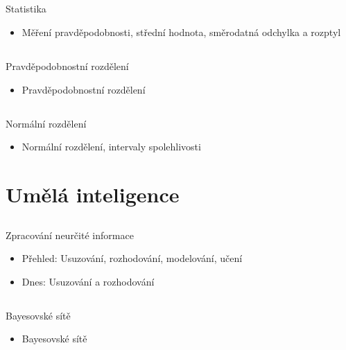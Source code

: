 \documentclass{beamer}
\begin{document}
\subsection{}
\begin{frame}{Statistika}
\begin{itemize}
\item Měření pravděpodobnosti, střední hodnota, směrodatná odchylka a rozptyl
\end{itemize}
\end{frame}

\subsection{}
\begin{frame}{Pravděpodobnostní rozdělení}
\begin{itemize}
\item Pravděpodobnostní rozdělení
\end{itemize}
\end{frame}

\subsection{}
\begin{frame}{Normální rozdělení}
\begin{itemize}
\item Normální rozdělení, intervaly spolehlivosti
\end{itemize}
\end{frame}

\section{Umělá inteligence}

\subsection{}
\begin{frame}{Zpracování neurčité informace}
\begin{itemize}
\item Přehled: Usuzování, rozhodování, modelování, učení
\item Dnes: Usuzování a rozhodování
\end{itemize}
\end{frame}

\subsection{}
\begin{frame}{Bayesovské sítě}
\begin{itemize}
\item Bayesovské sítě
\end{itemize}
\end{frame}
\end{document}
